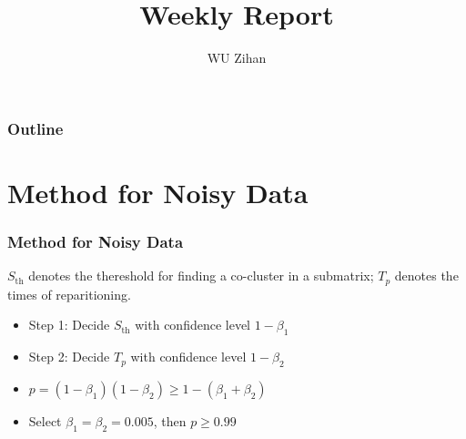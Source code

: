 \documentclass{beamer}
\title{Weekly Report}
\author{WU Zihan}
\begin{document}
\maketitle
\begin{frame}
    \frametitle{Outline}
    \tableofcontents
\end{frame}

\section{Method for Noisy Data}
\begin{frame}
    \frametitle{Method for Noisy Data}
    $S_{\text{th}}$ denotes the thereshold for finding a co-cluster in a submatrix;
    $T_p$ denotes the times of reparitioning.
    \begin{itemize}
        \item Step 1: Decide $S_{\text{th}}$ with confidence level $1 - \beta_1$
        \item Step 2: Decide $T_p$ with confidence level $1 - \beta_2$
        \item $p = (1 - \beta_1)(1 - \beta_2) \ge 1 - (\beta_1 + \beta_2)$
        \item Select $\beta_1 = \beta_2 = 0.005$, then $p \ge 0.99$
    \end{itemize}
\end{frame}
\end{document}
